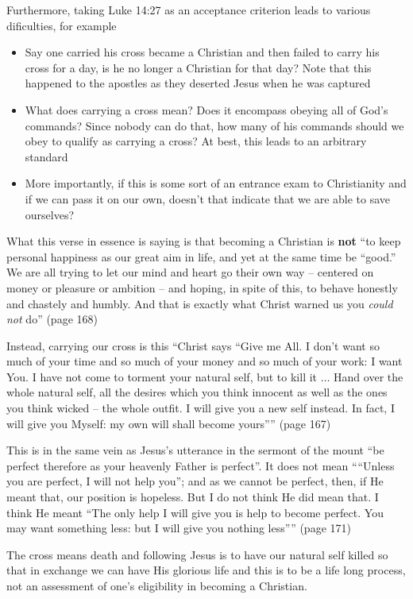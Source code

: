 \documentclass[aps,preprint,preprintnumbers,nofootinbib,showpacs,prd]{revtex4-1}
\newcommand{\bit}{\begin{itemize}}
\newcommand{\eit}{\end{itemize}}
\begin{document}
Furthermore, taking Luke 14:27 as an acceptance criterion leads to various dificulties, for example
\bit
\item Say one carried his cross became a Christian and then failed to carry his cross for a day, is he no longer a Christian for that day? Note that this happened to the apostles as they deserted Jesus when he was captured
\item What does carrying a cross mean? Does it encompass obeying all of God's commands? Since nobody can do that, how many of his commands should we obey to qualify as carrying a cross? At best, this leads to an arbitrary standard
\item More importantly, if this is some sort of an entrance exam to Christianity and if we can pass it on our own, doesn't that indicate that we are able to save ourselves?
\eit

What this verse in essence is saying is that becoming a Christian is {\bf not} ``to keep personal happiness as our great aim in life, and yet at the same time be ``good.'' We are all trying to let our mind and heart go their own way -- centered on money or pleasure or ambition -- and hoping, in spite of this, to behave honestly and chastely and humbly. And that is exactly what Christ warned us you {\it could not } do'' (page 168)

Instead, carrying our cross is this ``Christ says ``Give me All. I don't want so much of your time and so much of your money and so much of your work: I want You. I have not come to torment your natural self, but to kill it $\dots$ Hand over the whole natural self, all the desires which you think innocent as well as the ones you think wicked -- the whole outfit. I will give you a new self instead. In fact, I will give you Myself: my own will shall become yours'''' (page 167)

This is in the same vein as Jesus's utterance in the sermont of the mount ``be perfect therefore as your heavenly Father is perfect''. It does not mean ````Unless you are perfect, I will not help you''; and as we cannot be perfect, then, if He meant that, our position is hopeless. But I do not think He did mean that. I think He meant ``The only help I will give you is help to become perfect. You may want something less: but I will give you nothing less'''' (page 171)

The cross means death and following Jesus is to have our natural self killed so that in exchange we can have His glorious life and this is to be a life long process, not an assessment of one's eligibility in becoming a Christian.
\end{document}
